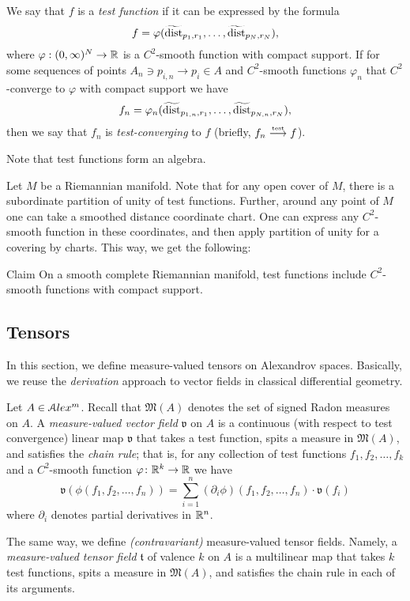We say that $f$ is a \emph{test function} if it can be expressed by the formula
$$f=\varphi( \widetilde{\operatorname{\rm dist}}_{p_1,r_1}, \dots,   \widetilde{\operatorname{\rm dist}}_{p_N,r_N}),$$
where $\varphi:(0,\infty)^N\to\mathbb{R}$ is a $C^2$-smooth function with compact support.
If for some sequences of points $A_n\ni p_{i,n}\to p_i\in A$ and $C^2$-smooth functions $\varphi_n$ that $C^2$-converge to $\varphi$ with compact support we have
$$f_n=\varphi_n( \widetilde{\operatorname{\rm dist}}_{p_{1,n},r_1},\dots,   \widetilde{\operatorname{\rm dist}}_{p_{N,n},r_N}),$$
then we say that $f_n$ is \emph{test-converging} to $f$ (briefly, $f_n\stackrel{\text{\tiny\rm test}}{\longrightarrow} f$).

Note that test functions form an algebra.

Let $M$ be a Riemannian manifold.
Note that for any open cover of $M$, there is a subordinate partition of unity of test functions.
Further, around any point of $M$ one can take a smoothed distance 
coordinate chart.
One can express any $C^2$-smooth function in these 
coordinates, and then apply partition of unity for a covering by charts.
This way, we get the following:

\begin{thm}{Claim}
On a smooth complete Riemannian manifold, test functions
include $C^2$-smooth functions with compact support.
\end{thm}
 
\subsection{Tensors}

In this section, we define measure-valued tensors on Alexandrov spaces.
Basically, we reuse the \emph{derivation} approach to vector fields in classical differential geometry. 

Let $A\in \mathcal{A}lex^m$.
Recall that $\mathfrak M(A)$
denotes the set of signed Radon measures on $A$.
A \emph{measure-valued vector field} $\mathfrak{v}$  on $A$
is a  continuous (with respect to test convergence) linear map
$\mathfrak{v}$ that takes a test function,
spits a measure in $\mathfrak M(A)$,
and satisfies the \emph{chain rule};
that is, for any collection of test functions $f_1,f_2,\dots,f_k$
and a $C^2$-smooth function $\varphi\colon\mathbb{R}^k\to\mathbb{R}$ we have
$$\mathfrak{v}(\phi(f_1,f_2,\dots,f_n))
=
\sum_{i=1}^n (\partial_i\phi)(f_1,f_2,\dots,f_n)\cdot\mathfrak{v}(f_i)$$
where $\partial_i$ denotes partial derivatives in $\mathbb{R}^n$.

The same way, we define \emph{(contravariant)} measure-valued tensor fields.
Namely, a \emph{measure-valued tensor field} $\mathfrak{t}$ of valence $k$ on $A$ is a multilinear map that takes $k$ test functions, spits a measure in $\mathfrak M(A)$, and satisfies the chain rule in each of its arguments.


